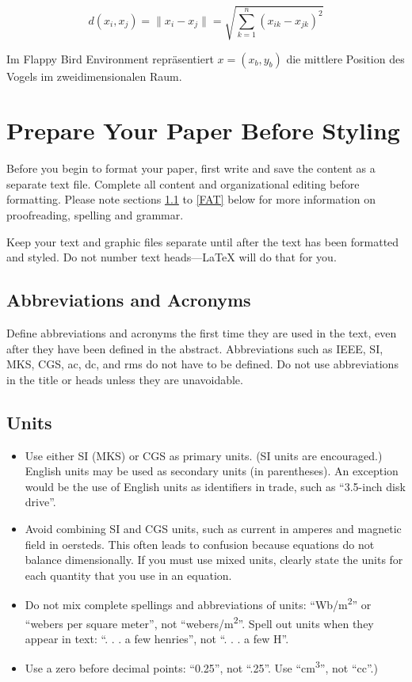 \documentclass[conference]{IEEEtran}
\begin{document}
\begin{equation}
	d(x_i, x_j) = \|x_i - x_j\| = \sqrt{ \sum_{k=1}^{n} (x_{ik} - x_{jk})^2 }
	\label{eq:euklidische_distanz}
\end{equation}

Im Flappy Bird Environment repräsentiert \( x = (x_b, y_b) \) die mittlere Position des Vogels im zweidimensionalen Raum.


\section{Prepare Your Paper Before Styling}
Before you begin to format your paper, first write and save the content as a 
separate text file. Complete all content and organizational editing before 
formatting. Please note sections \ref{AA} to \ref{FAT} below for more information on 
proofreading, spelling and grammar.

Keep your text and graphic files separate until after the text has been 
formatted and styled. Do not number text heads---{\LaTeX} will do that 
for you.

\subsection{Abbreviations and Acronyms}\label{AA}
Define abbreviations and acronyms the first time they are used in the text, 
even after they have been defined in the abstract. Abbreviations such as 
IEEE, SI, MKS, CGS, ac, dc, and rms do not have to be defined. Do not use 
abbreviations in the title or heads unless they are unavoidable.

\subsection{Units}
\begin{itemize}
\item Use either SI (MKS) or CGS as primary units. (SI units are encouraged.) English units may be used as secondary units (in parentheses). An exception would be the use of English units as identifiers in trade, such as ``3.5-inch disk drive''.
\item Avoid combining SI and CGS units, such as current in amperes and magnetic field in oersteds. This often leads to confusion because equations do not balance dimensionally. If you must use mixed units, clearly state the units for each quantity that you use in an equation.
\item Do not mix complete spellings and abbreviations of units: ``Wb/m\textsuperscript{2}'' or ``webers per square meter'', not ``webers/m\textsuperscript{2}''. Spell out units when they appear in text: ``. . . a few henries'', not ``. . . a few H''.
\item Use a zero before decimal points: ``0.25'', not ``.25''. Use ``cm\textsuperscript{3}'', not ``cc''.)
\end{itemize}
\end{document}
